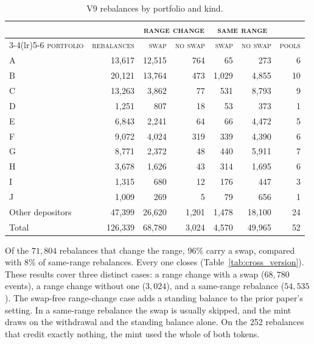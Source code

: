 \documentclass[11pt,a4paper]{article}
\DeclareRobustCommand{\thd}[1]{{\scshape\addfontfeatures{LetterSpace=1.5}\MakeLowercase{#1}}}
\theoremstyle{siphon}
\begin{document}
\begin{table}[!htb]
\centering
\caption{V9 rebalances by portfolio and kind.}
\label{tab:results}
\begin{tabular}{@{}lrrrrrr@{}}
\toprule
 & & \multicolumn{2}{c}{\thd{Range change}} & \multicolumn{2}{c}{\thd{Same range}} &  \\
\cmidrule(lr){3-4}\cmidrule(lr){5-6}
\thd{Portfolio} & \thd{Rebalances} & \thd{Swap} & \thd{No swap} & \thd{Swap} & \thd{No swap} & \thd{Pools}  \\
\midrule
A & 13{,}617 & 12{,}515 & 764 & 65 & 273 & 6 \\
B & 20{,}121 & 13{,}764 & 473 & 1{,}029 & 4{,}855 & 10 \\
C & 13{,}263 & 3{,}862 & 77 & 531 & 8{,}793 & 9 \\
D & 1{,}251 & 807 & 18 & 53 & 373 & 1 \\
E & 6{,}843 & 2{,}241 & 64 & 66 & 4{,}472 & 5 \\
F & 9{,}072 & 4{,}024 & 319 & 339 & 4{,}390 & 6 \\
G & 8{,}771 & 2{,}372 & 48 & 440 & 5{,}911 & 7 \\
H & 3{,}678 & 1{,}626 & 43 & 314 & 1{,}695 & 6 \\
I & 1{,}315 & 680 & 12 & 176 & 447 & 3 \\
J & 1{,}009 & 269 & 5 & 79 & 656 & 1 \\
Other depositors & 47{,}399 & 26{,}620 & 1{,}201 & 1{,}478 & 18{,}100 & 24 \\
\midrule
Total & 126{,}339 & 68{,}780 & 3{,}024 & 4{,}570 & 49{,}965 & 52 \\
\bottomrule
\end{tabular}
\end{table}

Of the $71{,}804$ rebalances that change the range, 96\% carry a swap, compared with 8\% of same-range rebalances. Every one closes (Table~\ref{tab:cross_version}). These results cover three distinct cases: a range change with a swap ($68{,}780$ events), a range change without one ($3{,}024$), and a same-range rebalance ($54{,}535$). The swap-free range-change case adds a standing balance to the prior paper's setting. In a same-range rebalance the swap is usually skipped, and the mint draws on the withdrawal and the standing balance alone. On the 252 rebalances that credit exactly nothing, the mint used the whole of both tokens.
\end{document}
